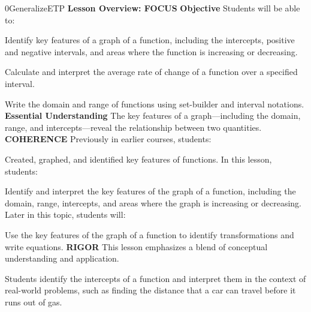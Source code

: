 \documentclass{article}
\newenvironment{te-addendum}[2]{}{}     %
\begin{document}
\begin{te-addendum}{0}{GeneralizeETP}
\textbf{Lesson Overview: FOCUS}
\textbf{Objective}
Students will be able to:
\item Identify key features of a graph of a function, including the intercepts, positive and negative intervals, and areas where the function is increasing or decreasing.
\item Calculate and interpret the average rate of change of a function over a specified interval.
\item Write the domain and range of functions using set-builder and interval notations.
\textbf{Essential Understanding}
The key features of a graph—including the domain, range, and intercepts—reveal the relationship between two quantities.
\textbf{COHERENCE}
Previously in earlier courses, students:
\item Created, graphed, and identified key features of functions.
In this lesson, students:
\item Identify and interpret the key features of the graph of a function, including the domain, range, intercepts, and areas where the graph is increasing or decreasing.
Later in this topic, students will:
\item Use the key features of the graph of a function to identify transformations and write equations.
\textbf{RIGOR}
This lesson emphasizes a blend of conceptual understanding and application.
\item Students identify the intercepts of a function and interpret them in the context of real-world problems, such as finding the distance that a car can travel before it runs out of gas.
\end{te-addendum}
\end{document}
